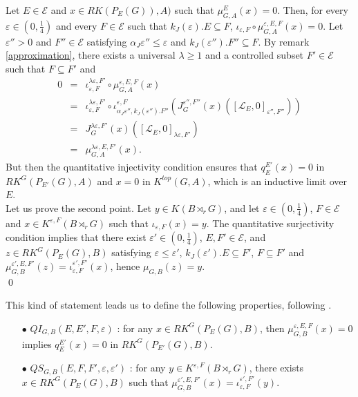 \begin{dem}
Let $E\in\mathcal E$ and $x\in RK(P_E(G)),A)$ such that $\mu_{G,A}^E(x)=0$. Then, for every $\varepsilon\in (0,\frac{1}{4})$ and every $F\in\mathcal E$ such that $k_J(\varepsilon).E\subseteq F$, $\iota_{\varepsilon,F}\circ\mu_{G,A}^{\varepsilon,E,F}(x)=0$. Let $\varepsilon''>0$ and $F''\in\mathcal E$ satisfying $\alpha_J\varepsilon''\leq \varepsilon$ and $k_J(\varepsilon''). F''\subseteq F$. By remark \ref{approximation}, there exists a universal $\lambda\geq 1$ and a controlled subset $F'\in\mathcal E$ such that $F\subseteq F'$ and
\[\begin{array}{lll}0 &  =  & \iota_{\varepsilon,F}^{\lambda\varepsilon,F'}\circ \mu_{G,A}^{\varepsilon,E,F}(x) \\
			& = & \iota_{\varepsilon,F}^{\lambda\varepsilon,F'}\circ \iota^{\varepsilon,F}_{\alpha_J\varepsilon'',k_J(\varepsilon'').F''} (J_{G}^{\varepsilon'',F''}(x)([\mathcal L_E,0]_{\varepsilon'',F''})) \\
			& = & J_{G}^{\lambda\varepsilon,F'}(x)([\mathcal L_E,0]_{\lambda\varepsilon,F'}) \\
			& = & \mu_{G,A}^{\lambda\varepsilon,E,F'}(x).
\end{array}\]
But then the quantitative injectivity condition ensures that $q_E^{E'}(x)=0$ in $RK^G(P_{E'}(G),A)$ and $x=0$ in $K^{top}(G,A)$, which is an inductive limit over $E$.\\

Let us prove the second point. Let $y\in K(B\rtimes_r G)$, and let $\varepsilon\in (0,\frac{1}{4})$, $F\in\mathcal E$ and $x\in K^{\varepsilon,F}(B\rtimes_r G)$ such that $\iota_{\varepsilon,F}(x) =y$. The quantitative surjectivity condition implies that there exist $\varepsilon'\in (0,\frac{1}{4})$, $E,F'\in\mathcal E$, and $z\in RK^G(P_E(G),B)$ satisfying $\varepsilon\leq \varepsilon'$, $k_J(\varepsilon').E\subseteq F'$, $F\subseteq F'$ and $\mu_{G,B}^{\varepsilon',E,F'}(z) = \iota_{\varepsilon,F}^{\varepsilon',F'} (x)$, hence $\mu_{G,B}(z) =y$.\\
\qed
\end{dem}

This kind of statement leads us to define the following properties, following \cite{OY3}.\\
\begin{itemize}
\item[$\bullet$] $QI_{G,B}(E,E',F,\varepsilon)$ : for any $x\in RK^G(P_E(G), B )$, then $\mu^{\varepsilon,E,F}_{G,B}(x) = 0$ implies $q_E^{E'}(x)=0$ in $RK^G(P_{E'}(G),B)$.
\item[$\bullet$] $QS_{G,B}(E,F,F',\varepsilon,\varepsilon')$ : for any $y\in K^{\varepsilon,F}(B\rtimes_r G)$, there exists $x\in RK^G(P_E(G),B)$ such that $\mu^{\varepsilon',E,F'}_{G,B}(x)=\iota_{\varepsilon,F}^{\varepsilon',F'}(y)$.\\
\end{itemize} 

